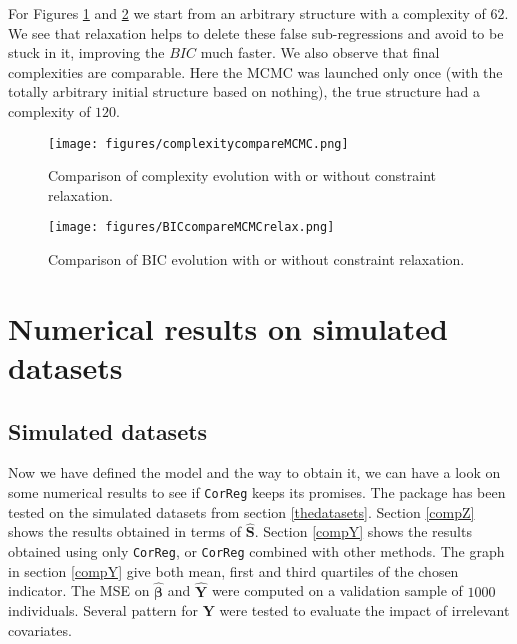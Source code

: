 \documentclass[12pt,a4paper]{report}
\begin{document}
		For Figures \ref{comparecomplrelax} and \ref{compareBICrelax} we start from an arbitrary structure with a complexity of $62$. We see that relaxation helps to delete these false sub-regressions and avoid to be stuck in it, improving the $BIC$ much faster. We also observe that final complexities are comparable. Here the MCMC was launched only once (with the totally arbitrary initial structure based on nothing), the true structure had a complexity of $120$.
\begin{center}
	\begin{figure}[h!]
	\centering
\texttt{[image: figures/complexitycompareMCMC.png]} 		
\caption{Comparison of complexity evolution with or without constraint relaxation.}\label{comparecomplrelax}
	\end{figure}
	\end{center}
			
\begin{center}
	\begin{figure}[h!]
	\centering
\texttt{[image: figures/BICcompareMCMCrelax.png]} 		
\caption{Comparison of BIC evolution with or without constraint relaxation.}\label{compareBICrelax}
	\end{figure}
	\end{center}
			
		
	\chapter{Numerical results on simulated datasets} \label{sectionsimul}


	\section{Simulated datasets}	
	Now we have defined the model and the way to obtain it, we can have a look on some numerical results to see if {\tt CorReg} 	keeps its promises.
	The package has been tested on the simulated datasets from section \ref{thedatasets}.
Section \ref{compZ} shows the results obtained in terms of $\hat{\boldsymbol{S}}$. Section \ref{compY} shows the results obtained using only {\tt CorReg}, or {\tt CorReg} combined with other methods. The graph in section \ref{compY} give both mean, first and third quartiles of the chosen indicator. The MSE on $\hat{\boldsymbol{\beta}}$ and $\hat{\boldsymbol{Y}}$ were computed on a validation sample of $1 000$ individuals. Several pattern for $\boldsymbol{Y}$ were tested to evaluate the impact of irrelevant covariates.\\
\end{document}
